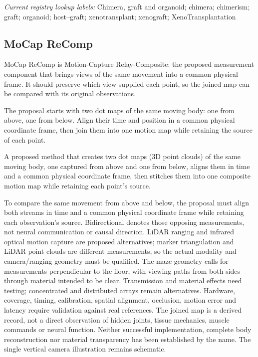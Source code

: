 \noindent\textit{Current registry lookup labels:} Chimera, graft and organoid; chimera; chimerism; graft; organoid; host–graft; xenotransplant; xenograft; XenoTransplantation\par

\begin{samepage}
\subsection*{MoCap ReComp}
\noindent MoCap ReComp is Motion-Capture Relay-Composite: the proposed measurement component that brings views of the same movement into a common physical frame. It should preserve which view supplied each point, so the joined map can be compared with its original observations.\par
\noindent The proposal starts with two dot maps of the same moving body: one from above, one from below. Align their time and position in a common physical coordinate frame, then join them into one motion map while retaining the source of each point.\par
\end{samepage}
\noindent A proposed method that creates two dot maps (3D point clouds) of the same moving body, one captured from above and one from below, aligns them in time and a common physical coordinate frame, then stitches them into one composite motion map while retaining each point’s source.\par
\noindent To compare the same movement from above and below, the proposal must align both streams in time and a common physical coordinate frame while retaining each observation’s source. Bidirectional denotes those opposing measurements, not neural communication or causal direction. LiDAR ranging and infrared optical motion capture are proposed alternatives; marker triangulation and LiDAR point clouds are different measurements, so the actual modality and camera/ranging geometry must be qualified. The maze geometry calls for measurements perpendicular to the floor, with viewing paths from both sides through material intended to be clear. Transmission and material effects need testing; concentrated and distributed arrays remain alternatives. Hardware, coverage, timing, calibration, spatial alignment, occlusion, motion error and latency require validation against real references. The joined map is a derived record, not a direct observation of hidden joints, tissue mechanics, muscle commands or neural function. Neither successful implementation, complete body reconstruction nor material transparency has been established by the name. The single vertical camera illustration remains schematic.\par
